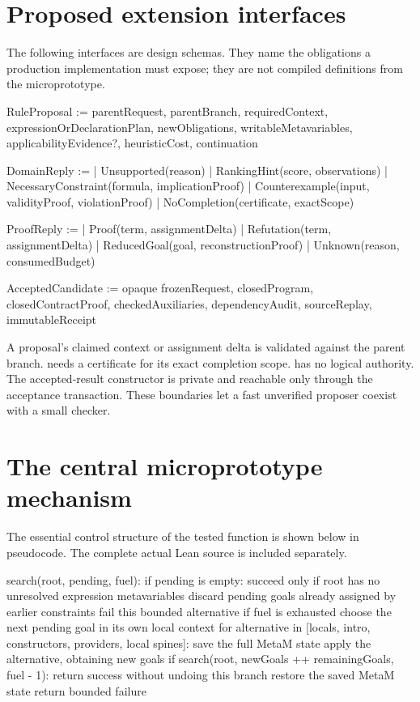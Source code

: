 \section{Proposed extension interfaces}

The following interfaces are design schemas. They name the obligations a
production implementation must expose; they are not compiled definitions from
the microprototype.

\begin{Code}
RuleProposal := {
  parentRequest, parentBranch, requiredContext,
  expressionOrDeclarationPlan,
  newObligations, writableMetavariables,
  applicabilityEvidence?, heuristicCost,
  continuation
}

DomainReply :=
  | Unsupported(reason)
  | RankingHint(score, observations)
  | NecessaryConstraint(formula, implicationProof)
  | Counterexample(input, validityProof, violationProof)
  | NoCompletion(certificate, exactScope)

ProofReply :=
  | Proof(term, assignmentDelta)
  | Refutation(term, assignmentDelta)
  | ReducedGoal(goal, reconstructionProof)
  | Unknown(reason, consumedBudget)

AcceptedCandidate := opaque {
  frozenRequest,
  closedProgram, closedContractProof, checkedAuxiliaries,
  dependencyAudit, sourceReplay,
  immutableReceipt
}
\end{Code}

A proposal's claimed context or assignment delta is validated against the
parent branch.  needs a certificate for its exact completion
scope.  has no logical authority. The accepted-result
constructor is private and reachable only through the acceptance transaction.
These boundaries let a fast unverified proposer coexist with a small checker.

\section{The central microprototype mechanism}

The essential control structure of the tested  function is shown
below in pseudocode. The complete actual Lean source is included separately.

\begin{Code}
search(root, pending, fuel):
  if pending is empty:
      succeed only if root has no unresolved expression metavariables
  discard pending goals already assigned by earlier constraints
  fail this bounded alternative if fuel is exhausted
  choose the next pending goal in its own local context
  for alternative in [locals, intro, constructors, providers, local spines]:
      save the full MetaM state
      apply the alternative, obtaining new goals
      if search(root, newGoals ++ remainingGoals, fuel - 1):
          return success without undoing this branch
      restore the saved MetaM state
  return bounded failure
\end{Code}

